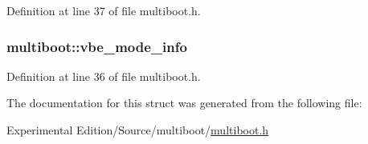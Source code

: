 Definition at line 37 of file multiboot.\+h.

\subsubsection[{\texorpdfstring{vbe\+\_\+mode\+\_\+info}{vbe_mode_info}}]{ multiboot\+::vbe\+\_\+mode\+\_\+info}\hypertarget{structmultiboot_a63734194b2fb809883046ac5b28a9300}{}\label{structmultiboot_a63734194b2fb809883046ac5b28a9300}


Definition at line 36 of file multiboot.\+h.



The documentation for this struct was generated from the following file\+:\begin{DoxyCompactItemize}
\item 
Experimental Edition/\+Source/multiboot/\hyperlink{multiboot_8h}{multiboot.\+h}\end{DoxyCompactItemize}
